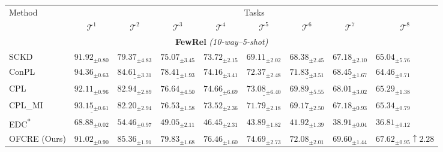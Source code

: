 \begin{table*}[ht]
\centering
\begin{adjustbox}{width=\textwidth}
\begin{tabular}{lllllllll}
\toprule
\multirow{2}{*}{Method} & \multicolumn{8}{c}{Tasks} \\
\cmidrule{2-9}
& \multicolumn{1}{c}{$\mathcal{T}^1$} & \multicolumn{1}{c}{$\mathcal{T}^2$} & \multicolumn{1}{c}{$\mathcal{T}^3$} & \multicolumn{1}{c}{$\mathcal{T}^4$} & \multicolumn{1}{c}{$\mathcal{T}^5$} & \multicolumn{1}{c}{$\mathcal{T}^6$} & \multicolumn{1}{c}{$\mathcal{T}^7$} & \multicolumn{1}{c}{$\mathcal{T}^8$}  \\ 
\toprule
\multicolumn{9}{c}{\textbf{FewRel} \textit{(10-way--5-shot)}} \\
\midrule
SCKD        & $91.92_{\pm 0.80}$ & $79.37_{\pm 4.83}$ & $75.07_{\pm 3.45}$ & $73.72_{\pm 2.15}$ & $69.11_{\pm 2.02}$ & $68.38_{\pm 2.45}$ & $67.18_{\pm 2.10}$ & $65.04_{\pm 5.76}$ \\ 
ConPL & $\mathbf{94.36_{\pm 0.63}}$ & $\underline{84.61_{\pm 3.31}}$ & $\underline{78.41_{\pm 1.93}}$ & $74.16_{\pm 3.41}$ & $72.37_{\pm 2.48}$ & $\underline{71.83_{\pm 3.51}}$ & $\underline{68.45_{\pm 1.67}}$ & $64.46_{\pm 0.71}$ \\
CPL  & {$92.11_{\pm 0.96}$} & $82.94_{\pm 2.89}$ & ${76.64_{\pm 4.50}}$ & $\underline{74.66_{\pm 6.69}}$ & $\underline{73.08_{\pm 6.40}}$ & $69.89_{\pm 5.55}$ & $68.01_{\pm 3.02}$ & $65.29_{\pm 1.38}$ \\ %
CPL\_MI & $\underline{93.15_{\pm 0.61}}$ & {$82.20_{\pm 2.94}$} & {$76.53_{\pm 1.58}$} & {$73.52_{\pm 2.36}$} & {$71.79_{\pm 2.18}$} & {$69.17_{\pm 2.50}$} & {$67.18_{\pm 0.93}$} & \underline{$65.34_{\pm 0.79}$} \\
EDC\textsuperscript{*} & $68.88_{\pm 0.02}$ & {$54.46_{\pm 0.97}$} & {$49.05_{\pm 2.11}$} & {$46.45_{\pm 2.31}$} & {$43.89_{\pm 1.82}$} & {$41.92_{\pm 1.39}$} & {$38.91_{\pm 0.04}$} & {$36.81_{\pm 0.12}$} \\%
OFCRE (Ours) & $91.02_{\pm 0.90}$ & $\mathbf{85.36_{\pm 1.91}}$ & $\mathbf{79.83_{\pm 1.68}}$ & $\mathbf{76.46_{\pm 1.60}}$ & $\mathbf{74.69_{\pm 2.73}}$ & $\mathbf{72.08_{\pm 2.01}}$ & $\mathbf{69.60_{\pm 1.44}}$ & $\mathbf{67.62_{\pm 0.95}}${\color{darkgreen}\footnotesize $\uparrow{2.28}$} \\


\end{tabular}
\end{adjustbox}
\end{table*}
